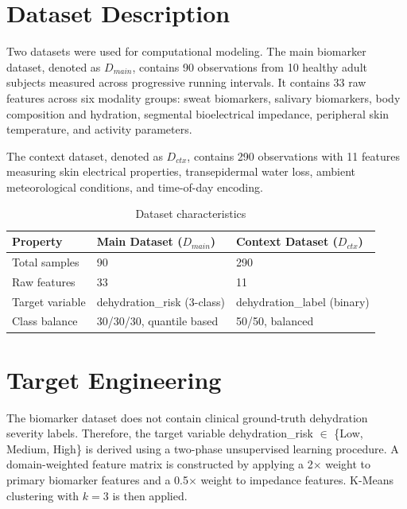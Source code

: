 \section{Dataset Description}

Two datasets were used for computational modeling. The main biomarker dataset, denoted as $D_{main}$, contains 90 observations from 10 healthy adult subjects measured across progressive running intervals. It contains 33 raw features across six modality groups: sweat biomarkers, salivary biomarkers, body composition and hydration, segmental bioelectrical impedance, peripheral skin temperature, and activity parameters.

The context dataset, denoted as $D_{ctx}$, contains 290 observations with 11 features measuring skin electrical properties, transepidermal water loss, ambient meteorological conditions, and time-of-day encoding.

\begin{table}[htb]
\fontsize{10}{12}\selectfont
\centering
\renewcommand{\arraystretch}{1.6}
\setlength{\extrarowheight}{4pt}
\caption{Dataset characteristics}
\label{tab:dataset-characteristics}
\begin{tabular}{|p{4cm}|p{4.2cm}|p{4.2cm}|}
\hline
\textbf{Property} & \textbf{Main Dataset ($D_{main}$)} & \textbf{Context Dataset ($D_{ctx}$)}\\
\hline
Total samples & 90 & 290\\
\hline
Raw features & 33 & 11\\
\hline
Target variable & dehydration\_risk (3-class) & dehydration\_label (binary)\\
\hline
Class balance & 30/30/30, quantile based & 50/50, balanced\\
\hline
\end{tabular}
\end{table}

\section{Target Engineering}

The biomarker dataset does not contain clinical ground-truth dehydration severity labels. Therefore, the target variable dehydration\_risk $\in$ \{Low, Medium, High\} is derived using a two-phase unsupervised learning procedure. A domain-weighted feature matrix is constructed by applying a 2$\times$ weight to primary biomarker features and a 0.5$\times$ weight to impedance features. K-Means clustering with $k=3$ is then applied.


